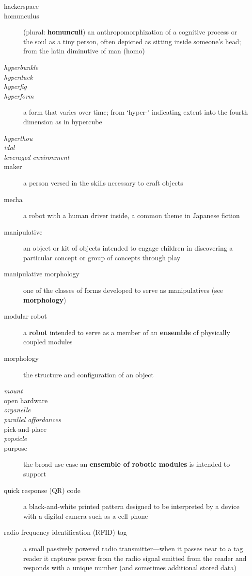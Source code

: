 \begin{description}
%
\item[hackerspace]
%
\item[homunculus] (plural: {\bf homunculi}) an anthropomorphization of a cognitive process or the soul as a tiny person, often depicted as sitting inside someone's head; from the latin diminutive of man (homo)
%
\item[\emph{hyperbunkle}]
%
\item[\emph{hyperduck}]
%
\item[\emph{hyperfig}]
%
\item[\emph{hyperform}] a form that varies over time; from `hyper-' indicating extent into the fourth dimension as in hypercube
%
\item[\emph{hyperthou}]
%
\item[\emph{idol}]
%
\item[\emph{leveraged environment}]
%
\item[maker] a person versed in the skills necessary to craft objects
%
\item[mecha] a robot with a human driver inside, a common theme in Japanese fiction
%
\item[manipulative] an object or kit of objects intended to engage children in discovering a particular concept or group of concepts through play
%
\item[manipulative morphology] one of the classes of forms developed to serve as manipulatives (see {\bf morphology})
%
\item[modular robot] a {\bf robot} intended to serve as a member of an {\bf ensemble} of physically coupled modules
%
\item[morphology] the structure and configuration of an object
%
\item[\emph{mount}]
%
\item[open hardware]
%
\item[\emph{organelle}]
%
\item[\emph{parallel affordances}]
%
\item[pick-and-place]
%
\item[\emph{popsicle}]
%
\item[purpose] the broad use case an {\bf ensemble of robotic modules} is intended to support
%
\item[quick response (QR) code] a black-and-white printed pattern designed to be interpreted by a device with a digital camera such as a cell phone
%
\item[radio-frequency identification (RFID) tag] a small passively powered radio transmitter---when it passes near to a tag reader it captures power from the radio signal emitted from the reader and responds with a unique number (and sometimes additional stored data)

\end{description}
